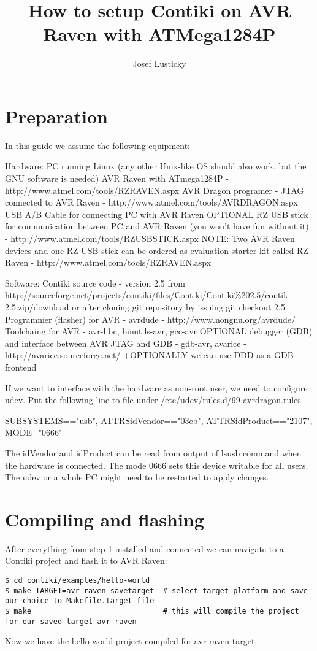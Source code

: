 \documentclass{article}
\begin{document}
\title{How to setup Contiki on AVR Raven with ATMega1284P}
\author{Josef Lusticky}

\maketitle

\section{Preparation}
In this guide we assume the following equipment:

Hardware:
PC running Linux (any other Unix-like OS should also work, but the GNU software is needed)
AVR Raven with ATmega1284P - http://www.atmel.com/tools/RZRAVEN.aspx
AVR Dragon programer - JTAG connected to AVR Raven - http://www.atmel.com/tools/AVRDRAGON.aspx
USB A/B Cable for connecting PC with AVR Raven
OPTIONAL RZ USB stick for communication between PC and AVR Raven (you won't have fun without it) - http://www.atmel.com/tools/RZUSBSTICK.aspx
NOTE: Two AVR Raven devices and one RZ USB stick can be ordered as evaluation starter kit called RZ Raven - http://www.atmel.com/tools/RZRAVEN.aspx




Software:
Contiki source code - version 2.5
	from\\
	http://sourceforge.net/projects/contiki/files/Contiki/Contiki\%202.5/contiki-2.5.zip/download
	or after cloning git repository by issuing git checkout 2.5
Programmer (flasher) for AVR - avrdude - http://www.nongnu.org/avrdude/
Toolchaing for AVR - avr-libc, binutils-avr, gcc-avr
OPTIONAL debugger (GDB) and interface between AVR JTAG and GDB - gdb-avr, avarice - http://avarice.sourceforge.net/
+OPTIONALLY we can use DDD as a GDB frontend


If we want to interface with the hardware as non-root user, we need to configure udev.
Put the following line to file under /etc/udev/rules.d/99-avrdragon.rules

SUBSYSTEMS=="usb", ATTRS{idVendor}=="03eb", ATTRS{idProduct}=="2107", MODE="0666"

The idVendor and idProduct can be read from output of lsusb command when the hardware is connected.
The mode 0666 sets this device writable for all users.
The udev or a whole PC might need to be restarted to apply changes.


\section{Compiling and flashing}
After everything from step 1 installed and connected we can navigate to a Contiki project and flash it to AVR Raven:
\begin{lstlisting}
$ cd contiki/examples/hello-world
$ make TARGET=avr-raven savetarget  # select target platform and save our choice to Makefile.target file
$ make                              # this will compile the project for our saved target avr-raven
\end{lstlisting}
Now we have the hello-world project compiled for avr-raven target.
\end{document}
